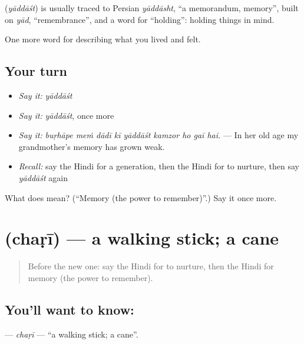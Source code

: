 \begin{cousinweb}
\textbf{} (\emph{yāddāśt}) is usually traced to Persian \emph{yāddāsht}, \textquotedblleft{}a memorandum, memory\textquotedblright{}, built on \emph{yād}, \textquotedblleft{}remembrance\textquotedblright{}, and a word for \textquotedblleft{}holding\textquotedblright{}: holding things in mind.
\end{cousinweb}

\begin{grammarlens}[title={What you've built}]
One more word for describing what you lived and felt.
\end{grammarlens}

\subsection*{Your turn}
\begin{itemize}
\raggedright
  \item \emph{Say it:} \emph{yāddāśt}
  \item \emph{Say it:} \emph{yāddāśt}, once more
  \item \emph{Say it:} \emph{buṛhāpe meṁ dādī kī yāddāśt kamzor ho gaī hai.} — In her old age my grandmother's memory has grown weak.
  \item \emph{Recall:} say the Hindi for a generation, then the Hindi for to nurture, then say \emph{yāddāśt} again
\end{itemize}

\begin{tcolorbox}[breakable,colback=teal!4,colframe=teal!35!black,title={Before you move on}]
What does  mean? (\textquotedblleft{}Memory (the power to remember)\textquotedblright{}.) Say it once more.
\end{tcolorbox}
\section[\texorpdfstring{\hi{छड़ी} (chaṛī)}{छड़ी (chaṛī)}]{ (chaṛī) — a walking stick; a cane}

\label{lesson:HI-C504-chari}



\begin{quote}
Before the new one: say the Hindi for to nurture, then the Hindi for memory (the power to remember).
\end{quote}

\subsection*{You'll want to know: }
\textbf{} — \emph{chaṛī} — \textquotedblleft{}a walking stick; a cane\textquotedblright{}.

